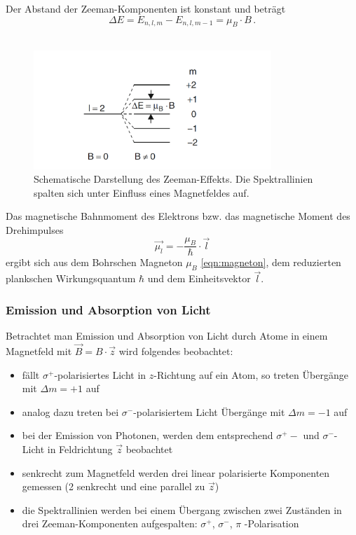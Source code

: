Der Abstand der Zeeman-Komponenten ist konstant und beträgt
\begin{equation}
    \Delta E = E_{n,l,m} - E_{n,l,m-1} = \mu_B \cdot B \, .
    \label{eqn:energie_dif_normal}
\end{equation}
\\
\begin{figure}
    \centering
    \includegraphics[width=0.8\textwidth]{content/data/zeeman_aufspaltung.png}
    \caption{Schematische Darstellung des Zeeman-Effekts. Die Spektrallinien spalten sich unter Einfluss eines Magnetfeldes auf.} %
    \label{fig:zeeman_aufspaltung}
\end{figure}

Das magnetische Bahnmoment des Elektrons bzw. das magnetische Moment des Drehimpulses
\begin{equation}
    \vec{\mu_l} = -\frac{\mu_B}{\hbar} \cdot \vec{l}
    \label{eqn:magn_moment_l}
\end{equation}
ergibt sich aus dem Bohrschen Magneton $\mu_B$ \eqref{eqn:magneton}, dem reduzierten plankschen Wirkungsquantum $\hbar$ und dem Einheitsvektor $\vec{l}$.
 
\subsubsection{Emission und Absorption von Licht}
Betrachtet man Emission und Absorption von Licht durch Atome in einem Magnetfeld mit $\vec{B} = B \cdot \vec{z}$ wird folgendes beobachtet:

\begin{itemize}
    \item fällt $\sigma^+$-polarisiertes Licht in $z$-Richtung auf ein Atom, so treten Übergänge mit $\Delta m = +1$ auf
    \item analog dazu treten bei $\sigma^-$-polarisiertem Licht Übergänge mit $\Delta m = -1$ auf
    \item bei der Emission von Photonen, werden dem entsprechend $\sigma^+ -$ und $\sigma^-$-Licht in Feldrichtung $\vec{z}$ beobachtet
    \item senkrecht zum Magnetfeld werden drei linear polarisierte Komponenten gemessen (2 senkrecht und eine parallel zu $\vec{z}$)
    \item die Spektrallinien werden bei einem Übergang zwischen zwei Zuständen in drei Zeeman-Komponenten aufgespalten: $\sigma^+$, $\sigma^-$, $\pi$ -Polarisation
\end{itemize}


